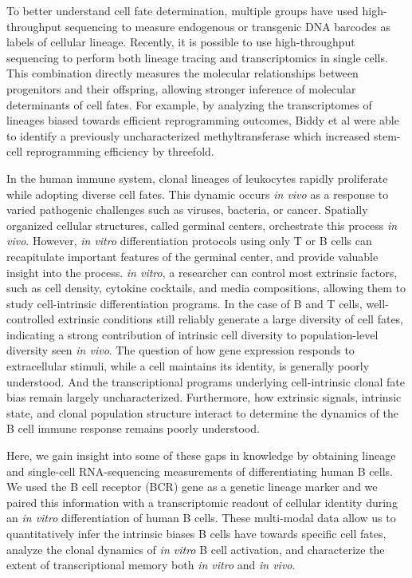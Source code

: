 To better understand cell fate determination, multiple groups have used high-throughput sequencing to measure endogenous or transgenic DNA barcodes as labels of cellular lineage\cite{lu_tracking_2011, naik_diverse_2013}. Recently, it is possible to use high-throughput sequencing to perform both lineage tracing and transcriptomics in single cells. This combination directly measures the molecular relationships between progenitors and their offspring, allowing stronger inference of molecular determinants of cell fates\cite{biddy_single-cell_2018, ludwig_lineage_2019, weinreb_lineage_2020}. For example, by analyzing the transcriptomes of lineages biased towards efficient reprogramming outcomes, Biddy et al were able to identify a previously uncharacterized methyltransferase which increased stem-cell reprogramming efficiency by threefold.

In the human immune system, clonal lineages of leukocytes rapidly proliferate while adopting diverse cell fates. This dynamic occurs \textit{in vivo} as a response to varied pathogenic challenges such as viruses, bacteria, or cancer. Spatially organized cellular structures, called germinal centers, orchestrate this process \textit{in vivo}. However, \textit{in vitro} differentiation protocols using only T or B cells can recapitulate important features of the germinal center, and provide valuable insight into the process\cite{deenick_switching_1999}. \textit{in vitro}, a researcher can control most extrinsic factors, such as cell density, cytokine cocktails, and media compositions, allowing them to study cell-intrinsic differentiation programs. In the case of B and T cells, well-controlled extrinsic conditions still reliably generate a large diversity of cell fates, indicating a strong contribution of intrinsic cell diversity to population-level diversity seen \textit{in vivo}\cite{cheon_cyton2_2021}. The question of how gene expression responds to extracellular stimuli, while a cell maintains its identity, is generally poorly understood. And the transcriptional programs underlying cell-intrinsic clonal fate bias remain largely uncharacterized. Furthermore, how extrinsic signals, intrinsic state, and clonal population structure interact to determine the dynamics of the B cell immune response remains poorly understood.

Here, we gain insight into some of these gaps in knowledge by obtaining lineage and single-cell RNA-sequencing measurements of differentiating human B cells. We used the B cell receptor (BCR) gene as a genetic lineage marker and we paired this information with a transcriptomic readout of cellular identity during an \textit{in vitro} differentiation of human B cells. These multi-modal data allow us to quantitatively infer the intrinsic biases B cells have towards specific cell fates, analyze the clonal dynamics of \textit{in vitro} B cell activation, and characterize the extent of transcriptional memory both \textit{in vitro} and \textit{in vivo}.

